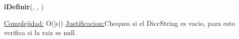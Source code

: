 \begin{Representacion}
\begin{Algoritmos}
\begin{algorithm}[H]{\textbf{iDefinir}(, , )}
	\begin{algorithmic}[1]
		\State 
		\medskip
		\Statex \underline{Complejidad:} O(|s|)
			\Statex \underline{Justificacion:}Chequea si el DiccString es vacio, para esto verifica si la raiz es null.  
	\end{algorithmic}
\end{algorithm}

\end{Algoritmos}

\end{Representacion}